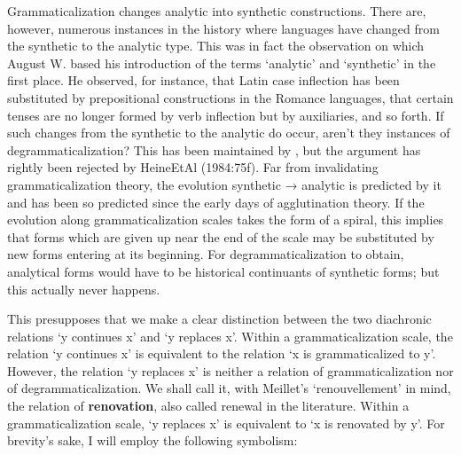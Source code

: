 Grammaticalization changes analytic into synthetic constructions. There are, however, numerous instances in the history where languages have changed from the synthetic to the analytic type. This was in fact the observation on which August W. \citet[14-30]{Schlegel1818} based his introduction of the terms ‘analytic’ and ‘synthetic’ in the first place. He observed, for instance, that Latin case inflection has been substituted by prepositional constructions in the Romance languages, that certain tenses are no longer formed by verb inflection but by auxiliaries, and so forth. If such changes from the synthetic to the analytic do occur, aren't they instances of degrammaticalization? This has been maintained by \citet[223-225]{Lightfoot1979}, but the argument has rightly been rejected by HeineEtAl (1984:75f). Far from invalidating grammaticalization theory, the evolution synthetic → analytic is predicted by it and has been so predicted since the early days of agglutination theory. If the evolution along grammaticalization scales takes the form of a spiral, this implies that forms which are given up near the end of the scale may be substituted by new forms entering at its beginning. For degrammaticalization to obtain, analytical forms would have to be historical continuants of synthetic forms; but this actually never happens.

This presupposes that we make a clear distinction between the two diachronic relations ‘y continues x’ and ‘y replaces x’. Within a grammaticalization scale, the relation ‘y continues x’ is equivalent to the relation ‘x is grammaticalized to y’. However, the relation ‘y replaces x’ is neither a relation of grammaticalization nor of degrammaticalization. We shall call it, with Meillet's ‘renouvellement’ in mind, the relation of \textbf{renovation}, also called renewal in the literature. Within a grammaticalization scale, ‘y replaces x’ is equivalent to ‘x is renovated by y’. For brevity's sake, I will employ the following symbolism:

%	
%	
%	
%	
%
%	
	
